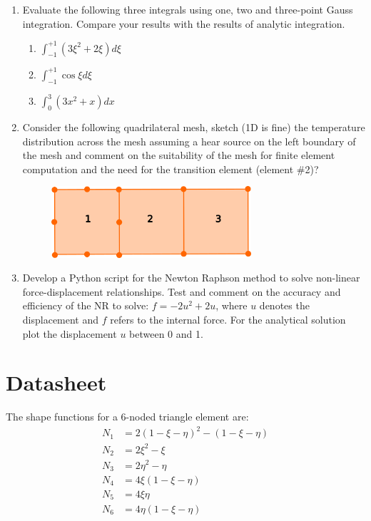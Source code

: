 \documentclass[a4paper,12pt]{article}
\begin{document}
\begin{enumerate}
	\item Evaluate the following three integrals using one, two and three-point Gauss integration.
	Compare your results with the results of analytic integration.
		\begin{enumerate}
			\item $\int_{-1}^{+1}(3\xi^2 + 2\xi) d\xi$
			\item $\int_{-1}^{+1} \cos \xi d\xi$
			\item $\int_{0}^{3} (3x^2 + x) dx$
		\end{enumerate}
		
	\item Consider the following quadrilateral mesh, sketch (1D is fine) the temperature distribution across the mesh assuming a hear source on the left boundary of the mesh and comment on the suitability of the mesh for finite element computation and the need for the transition element (element \#2)?
				
		\begin{figure}[!h]
			\centering
			\includegraphics[width=0.7\textwidth]{figs/transition-elements.png}
		\end{figure}

	\item Develop a Python script for the Newton Raphson method to solve non-linear force-displacement relationships. Test and comment on the accuracy and efficiency of the NR to solve: $f = - 2 u^2 + 2 u$, where $u$ denotes the displacement and $f$ refers to the internal force. For the analytical solution plot the displacement $u$ between 0 and 1.
\end{enumerate}

\section*{Datasheet}
The shape functions for a 6-noded triangle element are:
\begin{align*}
N_1 & = 2(1-\xi -\eta)^2 - (1 -\xi -\eta)\\
N_2 & = 2\xi^2 -\xi\\
N_3 & = 2\eta^2 -\eta\\
N_4 & = 4\xi(1 - \xi - \eta)\\
N_5 & = 4\xi\eta \\
N_6 & = 4 \eta(1 - \xi - \eta)\\
\end{align*}
\end{document}
